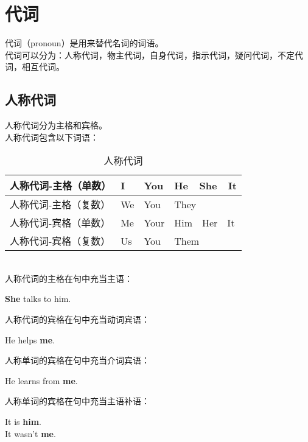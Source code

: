 \documentclass[UTF8]{ctexart}
\begin{document}
\section{代词}
    代词（{\ttfamily pronoun}）是用来替代名词的词语。\\[3mm]
    代词可以分为：人称代词，物主代词，自身代词，指示代词，疑问代词，不定代词，相互代词。

\subsection{人称代词}
    人称代词分为主格和宾格。\\[3mm]
    人称代词包含以下词语：\vspace{5pt}
    \begin{table}[h]
        \begin{center}
            \ttfamily
            \begin{tabular}{p{140pt}|p{40pt}|p{40pt}|p{100pt}}
                \hline
                人称代词-主格（单数）&I&You&He~~She~~It\\ \hline
                人称代词-主格（复数）&We&You&They\\ \hline
                人称代词-宾格（单数）&Me&Your&Him~~Her~~It\\ \hline
                人称代词-宾格（复数）&Us&You&Them\\ \hline
            \end{tabular}
            \rmfamily
            \caption{人称代词}
        \end{center}
    \end{table}\\
    人称代词的主格在句中充当主语：
    \begin{center}
        \ttfamily\large
        \textbf{She} talks to him.\\[6mm]
    \end{center}
    人称代词的宾格在句中充当动词宾语：
    \begin{center}
        \ttfamily\large
        He helps \textbf{me}.\\[6mm]
    \end{center}
    人称单词的宾格在句中充当介词宾语：
    \begin{center}
        \ttfamily\large
        He learns from \textbf{me}.\\[6mm]
    \end{center}
    人称单词的宾格在句中充当主语补语：
    \begin{center}
        \ttfamily\large
        It is \textbf{him}.\\[3mm]
        It wasn't \textbf{me}.\\[6mm]
    \end{center}
\end{document}

